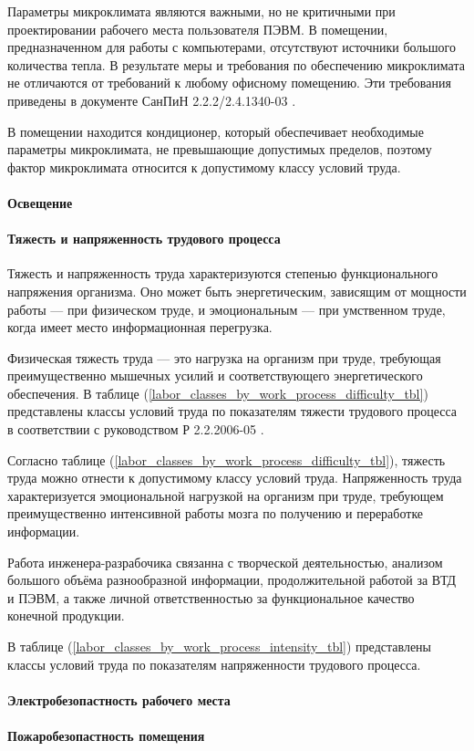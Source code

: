 Параметры микроклимата являются важными, но не критичными при проектировании
рабочего места пользователя ПЭВМ. В помещении, предназначенном для работы с
компьютерами, отсутствуют источники большого количества тепла. В результате меры
и требования по обеспечению микроклимата не отличаются от требований к любому
офисному помещению. Эти требования приведены в документе СанПиН 2.2.2/2.4.1340-03
\cite{ecology_sanpin_1340_03}.

В помещении находится кондиционер, который обеспечивает необходимые параметры
микроклимата, не превышающие допустимых пределов, поэтому фактор микроклимата
относится к допустимому классу условий труда.

\paragraph{Освещение}

\paragraph{Тяжесть и напряженность трудового процесса}

Тяжесть и напряженность труда характеризуются степенью функционального напряжения
организма. Оно может быть энергетическим, зависящим от мощности работы — при
физическом труде, и эмоциональным — при умственном труде, когда имеет место
информационная перегрузка.

Физическая тяжесть труда — это нагрузка на организм при труде, требующая
преимущественно мышечных усилий и соответствующего энергетического обеспечения.
В таблице (\ref{labor_classes_by_work_process_difficulty_tbl}) представлены классы
условий труда по показателям тяжести трудового процесса в соответствии с
руководством Р 2.2.2006-05 \cite{ecology_man_2_2_2006_05}.




Согласно таблице (\ref{labor_classes_by_work_process_difficulty_tbl}), тяжесть
труда можно отнести к допустимому классу условий труда. Напряженность труда
характеризуется эмоциональной нагрузкой на организм при труде, требующем
преимущественно интенсивной работы мозга по получению и переработке информации.

Работа инженера-разрабочика связанна с творческой деятельностью, анализом большого
объёма разнообразной информации, продолжительной работой за ВТД и ПЭВМ, а также
личной ответственностью за функциональное качество конечной продукции.

В таблице (\ref{labor_classes_by_work_process_intensity_tbl}) представлены классы
условий труда по показателям напряженности трудового процесса.

\paragraph{Электробезопастность рабочего места}

\paragraph{Пожаробезопастность помещения}
